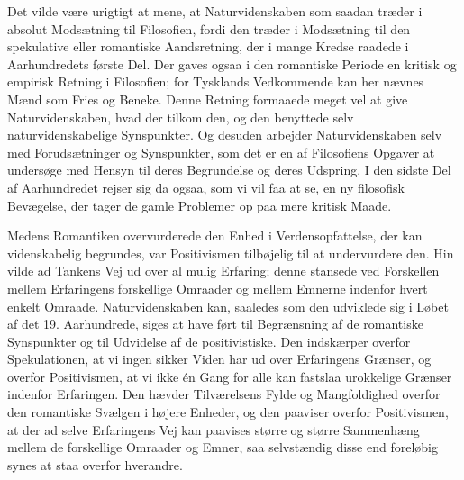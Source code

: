 \documentclass[12pt,a4paper,openany]{book}
\newcommand{\opage}[1]{\marginnote{\footnotesize\textit{[#1]}}}
\begin{document}
\opage{24}Det vilde være urigtigt at mene, at Naturvidenskaben som saadan
træder i absolut Modsætning til Filosofien, fordi den træder i Modsætning
til den spekulative eller romantiske Aandsretning, der i
mange Kredse raadede i Aarhundredets første Del. Der gaves ogsaa
i den romantiske Periode en kritisk og empirisk Retning i Filosofien;
for Tysklands Vedkommende kan her nævnes Mænd som Fries
og Beneke. Denne Retning formaaede meget vel at give Naturvidenskaben,
hvad der tilkom den, og den benyttede selv naturvidenskabelige
Synspunkter. Og desuden arbejder Naturvidenskaben selv med
Forudsætninger og Synspunkter, som det er en af Filosofiens Opgaver
at undersøge med Hensyn til deres Begrundelse og deres Udspring.
I den sidste Del af Aarhundredet rejser sig da ogsaa, som vi
vil faa at se, en ny filosofisk Bevægelse, der tager de gamle Problemer
op paa mere kritisk Maade.

Medens Romantiken overvurderede den Enhed i Verdensopfattelse,
der kan videnskabelig begrundes, var Positivismen tilbøjelig til at
undervurdere den. Hin vilde ad Tankens Vej ud over al mulig Erfaring;
denne stansede ved Forskellen mellem Erfaringens forskellige
Omraader og mellem Emnerne indenfor hvert enkelt Omraade.
Naturvidenskaben kan, saaledes som den udviklede sig i Løbet af
det 19. Aarhundrede, siges at have ført til Begrænsning af de romantiske
Synspunkter og til Udvidelse af de positivistiske. Den indskærper
overfor Spekulationen, at vi ingen sikker Viden har ud over Erfaringens
Grænser, og overfor Positivismen, at vi ikke én Gang for
alle kan fastslaa urokkelige Grænser indenfor Erfaringen. Den hævder
Tilværelsens Fylde og Mangfoldighed overfor den romantiske
Svælgen i højere Enheder, og den paaviser overfor Positivismen, at
der ad selve Erfaringens Vej kan paavises større og større Sammenhæng
mellem de forskellige Omraader og Emner, saa selvstændig
disse end foreløbig synes at staa overfor hverandre.
\end{document}
